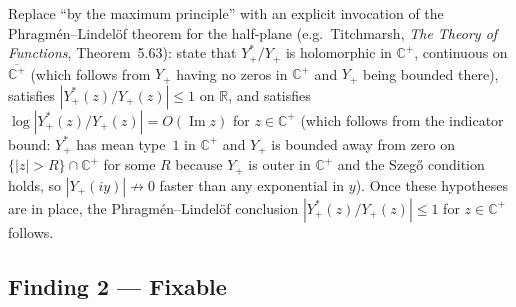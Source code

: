 \documentclass[11pt]{article}
\newcommand{\R}{\mathbb{R}}
\newcommand{\C}{\mathbb{C}}
\begin{document}
\begin{description}[leftmargin=0pt]
\item[What would establish it:]
Replace ``by the maximum principle'' with an explicit invocation of the
Phragm\'{e}n--Lindel\"{o}f theorem for the half-plane
(e.g.\ Titchmarsh, \emph{The Theory of Functions}, Theorem~5.63):
state that $Y_+^*/Y_+$ is holomorphic in $\C^+$, continuous on $\overline{\C^+}$
(which follows from $Y_+$ having no zeros in $\C^+$ and $Y_+$ being bounded there),
satisfies $|Y_+^*(z)/Y_+(z)|\le 1$ on $\R$, and satisfies
$\log|Y_+^*(z)/Y_+(z)|=O(\operatorname{Im}z)$ for $z\in\C^+$
(which follows from the indicator bound: $Y_+^*$ has mean type~$1$ in $\C^+$
and $Y_+$ is bounded away from zero on $\{|z|>R\}\cap\C^+$ for some $R$
because $Y_+$ is outer in $\C^+$ and the Szeg\H{o} condition holds, so
$|Y_+(iy)|\not\to 0$ faster than any exponential in $y$).
Once these hypotheses are in place, the Phragm\'{e}n--Lindel\"{o}f conclusion
$|Y_+^*(z)/Y_+(z)|\le 1$ for $z\in\C^+$ follows.
\end{description}

\subsection*{Finding 2 — Fixable}
\end{document}
